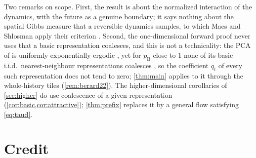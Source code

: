 \documentclass[11pt]{article}
\theoremstyle{plain}
\theoremstyle{definition}
\theoremstyle{remark}
\begin{document}
Two remarks on scope. First, the result is about the normalized interaction of the dynamics, with the future as a genuine boundary; it says nothing about the spatial Gibbs measure that a reversible dynamics samples, to which Maes and Shlosman apply their criterion \cite[Section~4, Example~3]{MS91}. Second, the one-dimensional forward proof never uses that a basic representation coalesces, and this is not a technicality: the PCA of \cite{Berard22} is uniformly exponentially ergodic \cite[Proposition~1]{Berard22}, yet for $p_{\mathrm B}$ close to $1$ none of its basic i.i.d.\ nearest-neighbour representations coalesces \cite[Theorem~1]{Berard22}, so the coefficient $q_t$ of every such representation does not tend to zero; \cref{thm:main} applies to it through the whole-history tiles (\cref{rem:berard22}). The higher-dimensional corollaries of \cref{sec:higher} do use coalescence of a given representation (\cref{cor:basic,cor:attractive}); \cref{thm:prefix} replaces it by a general flow satisfying \eqref{eq:taud}.

\section*{Credit}
\end{document}
